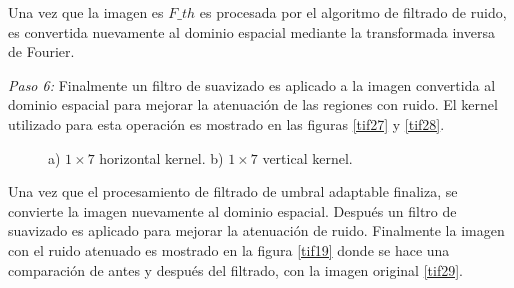 \documentclass[10pt,letterpaper]{article}
\begin{document}
Una vez que la imagen es $F\_th$ es procesada por el algoritmo de filtrado de ruido, es convertida nuevamente al dominio espacial mediante la transformada inversa de Fourier.

\textit{Paso 6:} Finalmente un filtro de suavizado es aplicado a la imagen convertida al dominio espacial para mejorar la atenuación de las regiones con ruido. El kernel utilizado para esta operación es mostrado en las figuras \ref{tif27} y \ref{tif28}. 

\begin{figure}[H]
      \begin{center}
        \caption{a) $1\times7$ horizontal kernel. b) $1\times7$ vertical kernel.\cite{Gonz:Rich}}
        \label{tif2728}
      \end{center}
    \end{figure}

Una vez que el procesamiento de filtrado de umbral adaptable finaliza, se convierte la imagen nuevamente al dominio espacial. Después un filtro de suavizado es aplicado para mejorar la atenuación de ruido. Finalmente la imagen con el ruido atenuado es mostrado en la figura \ref{tif19} donde se hace una comparación de antes y después del filtrado, con la imagen original \ref{tif29}.
\end{document}
